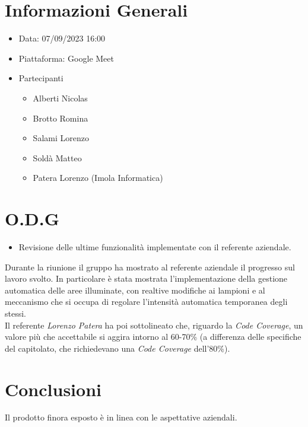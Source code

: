 \documentclass[a4paper, 12pt]{article}
\begin{document}
\makefrontpage
\section*{Informazioni Generali}
\begin{itemize}
    \item Data: 07/09/2023 16:00
    \item Piattaforma: Google Meet
    \item Partecipanti
          \begin{itemize}
              \item Alberti Nicolas
              \item Brotto Romina
              \item Salami Lorenzo
              \item Soldà Matteo
              \item Patera Lorenzo (Imola Informatica)
          \end{itemize}
\end{itemize}
\section*{O.D.G}
\begin{itemize}
    \item Revisione delle ultime funzionalità implementate con il referente aziendale.
\end{itemize}




 Durante la riunione il gruppo ha mostrato al referente aziendale il progresso sul 
lavoro svolto. In particolare è stata mostrata l'implementazione della gestione 
automatica delle aree illuminate, con realtive modifiche ai lampioni e al meccanismo 
che si occupa di regolare l'intensità automatica temporanea degli stessi.\\
Il referente \textit{Lorenzo Patera} ha poi sottolineato che, riguardo la 
\textit{Code Coverage}, un valore più che accettabile si aggira intorno al 
60-70\% (a differenza delle specifiche del capitolato, che richiedevano una 
\textit{Code Coverage} dell'80\%).




\section*{Conclusioni}
Il prodotto finora esposto è in linea con le aspettative aziendali.
\end{document}
